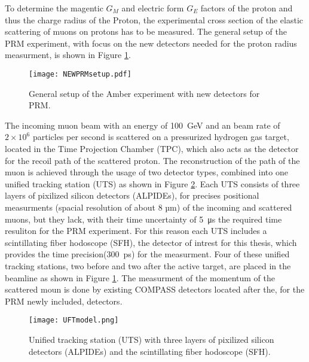 To determine the magentic $G_M$ and electric form $G_E$ factors of the proton and thus the charge radius of the Proton,
the experimental cross section of the elastic scattering of muons on protons has to be measured.
The general setup of the PRM experiment, with focus on the new detectors needed for the proton radius measurment, is shown in Figure \ref{fig:amber_setup}.
\begin{figure}[H]
	\centering
	\texttt{[image: NEWPRMsetup.pdf]}
	\caption{General setup of the Amber experiment with new detectors for PRM.\autocite{InternalcommunicationKarl}}
	\label{fig:amber_setup}
\end{figure}
The incoming muon beam with an energy of \SI{100} {\giga\electronvolt}\autocite{ProposalAmber} and an beam rate of $2 \times 10^6$\autocite{ConfrancePaperDAQ} particles per second is scattered on a pressurized hydrogen gas target,
located in the Time Projection Chamber (TPC), 
which also acts as the detector for the recoil path of the scattered proton.
\newline
The reconstruction of the path of the muon is achieved through the usage of two detector types,
combined into one unified tracking station (UTS) as shown in Figure \ref{UTSpicture}.
\newline
Each UTS consists of three layers of pixilized silicon detectors (ALPIDEs), for precises positional measurments (spacial resolution of about 8 µm\autocite{Amber2022Status}) of the incoming and scattered muons, 
but they lack, with their time uncertainty of \SI{5} {\micro\second}\autocite{Amber2022Status} the required time resuliton for the PRM experiment.
For this reason each UTS includes a scintillating fiber hodoscope (SFH), the detector of intrest for this thesis,
which provides the time precision(\SI{300} {\pico\second}\Autocite{Amber2022Status}) for the measurment.
\newline
Four of these unified tracking stations, two before and two after the active target, are placed in the beamline as shown in Figure \ref{fig:amber_setup}.
The measurment of the momentum of the scattered moun is done by existing COMPASS detectors located after the, 
for the PRM newly included, detectors\autocite{ProposalAmber}.

\begin{figure}[H]	
	\centering
	\texttt{[image: UFTmodel.png]}
	\caption{Unified tracking station (UTS) with three layers of pixilized silicon detectors (ALPIDEs) and the scintillating fiber hodoscope (SFH).\autocite{InternalcommunicationKarl}}
	\label{UTSpicture}
\end{figure}
